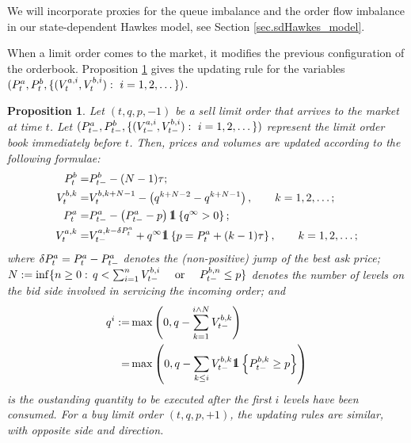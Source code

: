 \documentclass[10pt, article,table]{article}
\newtheorem{prop}[thm]{Proposition}
\begin{document}
We will incorporate proxies for the queue imbalance and the order flow imbalance in our state-dependent Hawkes model, see Section \ref{sec.sdHawkes_model}.

When a limit order comes to the market, it modifies the previous configuration of the orderbook. Proposition \ref{prop.lob_update} gives the updating rule for the variables $(\bestAskPrice_t, \bestBidPrice_t, \lbrace (\nthBestAskVolume[i]_t, \nthBestBidVolume[i]_t) : \, \, i=1,2,\dots\rbrace)$.
\begin{prop}\label{prop.lob_update}
 Let $(t,q,p,-1)$ be a sell limit order that arrives to the market at time $t$. Let $(\bestAskPrice_{t-}, \bestBidPrice_{t-},\lbrace  (\nthBestAskVolume[i]_{t-}, \nthBestBidVolume[i]_{t-}) : \, \, i=1,2,\dots\rbrace )$ represent the limit order book immediately before $t$. Then, prices and volumes are updated according to the following formulae:
 \begin{equation}\label{eq.lob_update_sell_order}
  \begin{split}
   \bestBidPrice_t =& \bestBidPrice_{t-} - (N-1)\tickSizeOfLOB;
   \\
   \nthBestBidVolume[k]_{t} 
   =& \nthBestBidVolume[k+N-1]_{t} 
   - \left( q^{k+N-2}-q^{k+N-1}\right), \qquad k=1,2,\dots ; 
   \\
   \bestAskPrice_t = & \bestAskPrice_{t-} 
   - \left(\bestAskPrice_{t-} - p\right) \one\left\lbrace q^{\infty} > 0\right\rbrace ; 
   \\
   \nthBestAskVolume[k]_t = &  \nthBestAskVolume[k-\delta\bestAskPrice_t]_{t-}
   +q^{\infty}\one\left\lbrace p=\bestAskPrice_t + (k-1)\tickSizeOfLOB \right\rbrace, \qquad k=1,2,\dots ;
  \end{split}
 \end{equation}
 where $\delta\bestAskPrice_t = \bestAskPrice_t - \bestAskPrice_{t-}$ denotes the (non-positive) jump of the best ask price;  $N := \inf\lbrace n\geq 0 : \, q<\sum_{i=1}^{n} \nthBestBidVolume[i]_{t-} \quad \text{ or } \quad  \nthBestBidPrice[n]_{t-}\leq p \rbrace$ denotes the number of levels on the bid side involved in servicing the incoming order; and 
 \begin{equation*}
  \begin{split}
   q^{i}:=& \max\left( 0, 
   q-\sum_{k=1}^{i\wedge N} \nthBestBidVolume[k]_{t-}
   \right)
   \\
   =& \max\left( 0, 
   q-\sum_{k\leq i} \nthBestBidVolume[k]_{t-}\one\left\lbrace \nthBestBidPrice[k]_{t-} \geq p\right\rbrace
   \right)
  \end{split}
 \end{equation*}
 is the oustanding quantity to be executed after the first $i$ levels have been consumed. 
 For a buy limit order  $(t,q,p,+1)$, the updating rules are similar, with opposite side and direction. 
\end{prop}
\end{document}
